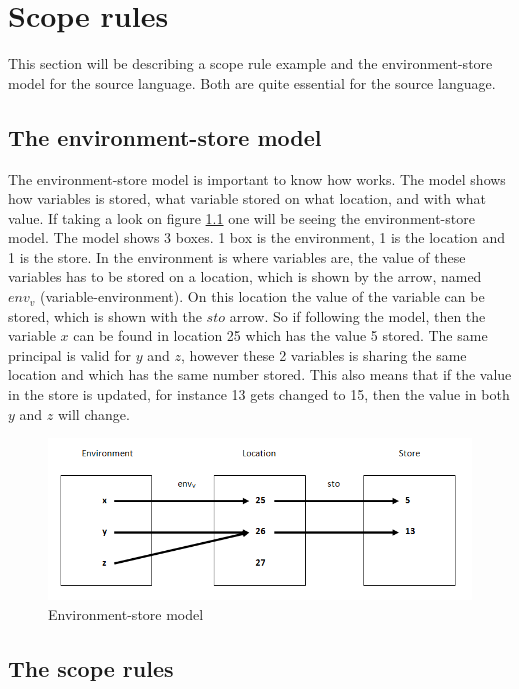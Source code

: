 \chapter{Scope rules}\label{chap:scope-rules}
This section will be describing a scope rule example and the environment-store model for the source language. Both are quite essential for the source language. 

\section{The environment-store model}\label{sec:es-model}
The environment-store model is important to know how works. The model shows how variables is stored, what variable stored on what location, and with what value. If taking a look on figure \ref{fig:esmodel} one will be seeing the environment-store model. The model shows 3 boxes. 1 box is the environment, 1 is the location and 1 is the store. In the environment is where variables are, the value of these variables has to be stored on a location, which is shown by the arrow, named $env_v$ (variable-environment). On this location the value of the variable can be stored, which is shown with the $sto$ arrow. So if following the model, then the variable $x$ can be found in location 25  which has the value 5 stored. The same principal is valid for $y$ and $z$, however these 2 variables is sharing the same location and which has the same number stored. This also means that if the value in the store is updated, for instance 13 gets changed to 15, then the value in both $y$ and $z$ will change. 
\begin{figure}[H]
\includegraphics{billeder/environment_store_model.png}
\caption{Environment-store model}
\label{fig:esmodel}
\end{figure}


\section{The scope rules}\label{sec:scope-rules}
